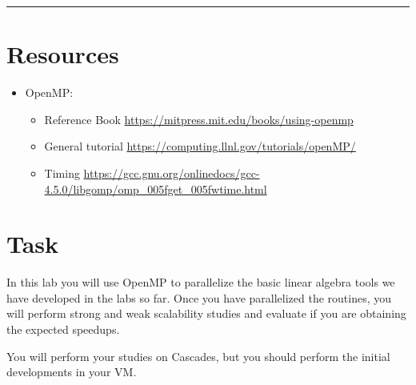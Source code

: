 \documentclass[letter]{article}
\begin{document}
\hrule

\pagebreak

\section*{Resources}

\begin{itemize}

    \item OpenMP:
        \begin{itemize}
            \item Reference Book \url{https://mitpress.mit.edu/books/using-openmp}
            \item General tutorial  \url{https://computing.llnl.gov/tutorials/openMP/}
            \item Timing  \url{https://gcc.gnu.org/onlinedocs/gcc-4.5.0/libgomp/omp_005fget_005fwtime.html}
        \end{itemize}
\end{itemize}

\section*{Task}
In this lab you will use OpenMP to parallelize the basic linear algebra tools we have developed in the labs so far.  Once you have parallelized the routines, you will perform strong and weak scalability studies and evaluate if you are obtaining the expected speedups.

You will perform your studies on Cascades, but you should perform the initial developments in your VM.
\end{document}
